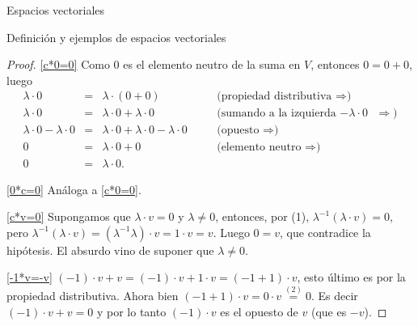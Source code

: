 \begin{chapter}{Espacios vectoriales}
\begin{section}{Definici\'on y ejemplos de espacios vectoriales}
\begin{proof}
                \ref{c*0=0} Como $0$ es el elemento neutro de la suma en $V$, entonces $0 = 0 +0$, luego 
                \begin{equation*}
                    \begin{array}{rllll}
                    \lambda\cdot 0 &=& \lambda\cdot (0+0)&\quad&\text{(propiedad distributiva $\Rightarrow$)}  \\
                    \lambda\cdot 0&=& \lambda\cdot 0 + \lambda\cdot 0 && \text{(sumando a la izquierda $-\lambda\cdot 0$ $\Rightarrow$)} \\
                \lambda\cdot 0 - \lambda\cdot 0 &=& \lambda\cdot 0 + \lambda\cdot 0 -\lambda\cdot 0 && \text{(opuesto $\Rightarrow$)}\\
                    0 &=& \lambda\cdot 0 +0  &&\text{(elemento neutro $\Rightarrow$)}\\
                    0 &=& \lambda\cdot 0.
                    \end{array}
                \end{equation*}
                
                \ref{0*c=0} Análoga a \ref{c*0=0}.
                
                \ref{c*v=0} Supongamos que  $\lambda\cdot v=0$ y  $\lambda \ne 0$, entonces, por (1), $ \lambda^{-1}(\lambda\cdot v)=0$, pero $\lambda^{-1}(\lambda\cdot v) = (\lambda^{-1}\lambda)\cdot v = 1\cdot v = v$. Luego $0=v$,  que contradice la hipótesis. El absurdo vino de suponer que $\lambda \ne 0$.
                
                \ref{-1*v=-v}  $(-1)\cdot v +v = (-1)\cdot v +1\cdot v = (-1+1)\cdot v$,  esto último es por la propiedad distributiva. Ahora bien $(-1+1)\cdot v = 0\cdot v \overset{(2)}{=} 0$. Es decir   $(-1)\cdot v +v = 0$ y por lo tanto  $(-1)\cdot v$ es el opuesto de $v$ (que es $-v$).  
            \end{proof}


\end{section}
\end{chapter}
